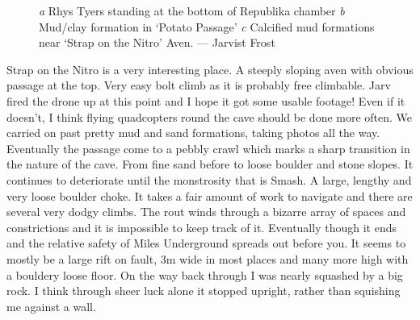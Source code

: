 \begin{figure*}[t]
\checkoddpage \ifoddpage \forcerectofloat \else \forceversofloat \fi
    \centering
          
    \begin{subfigure}[t]{\textwidth}
   		 \centering
		\label{republika}
 		 \vspace{0cm}
      \end{subfigure}
              
     \begin{subfigure}[t]{0.355\textwidth}
       		 \centering
       		 \caption{} \label{Will Scott bolting}
      \end{subfigure}
      \hfill
      \begin{subfigure}[t]{0.629\textwidth}
       	 	\centering
        		\caption{} \label{mud formations}
    	\end{subfigure}

    \caption{
        	\emph{a}  Rhys Tyers standing at the bottom of Republika chamber
    	 \emph{b} Mud/clay formation in `Potato Passage' 
  	 \emph{c} Calcified mud formations near `Strap on the Nitro' Aven. --- Jarvist Frost}
\end{figure*}

Strap on the Nitro is a very interesting place. A steeply sloping aven with obvious passage at the top. Very easy bolt climb as it is probably free climbable. Jarv fired the drone up at this point and I hope it got some usable footage! Even if it doesn't,  I think flying quadcopters round the cave should be done more often.
We carried on past pretty mud  and sand formations, taking photos all the way. Eventually the passage come to a pebbly crawl which marks a sharp transition in the nature of the cave.  From fine sand before to loose boulder and stone slopes. It continues to deteriorate until the monstrosity that is Smash. A large, lengthy and very loose boulder choke. 
It takes a fair amount of work to navigate and there are several very dodgy climbs. The rout winds through a bizarre array of spaces and constrictions and it is impossible to keep track of it.
Eventually though it ends and the relative safety of Miles Underground spreads out before you. It seems to mostly be a large rift on fault, 3m wide in most places and many more high with a bouldery loose floor. On the way back through I was nearly squashed by a big rock. I think through sheer luck alone it stopped upright, rather than squishing me against a wall. 


